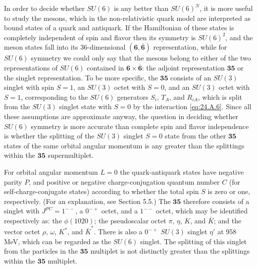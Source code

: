 In order to decide whether $SU(6)$ is any better than $SU(6)^N$, it is more
useful to study the mesons, which in the non-relativistic quark model are
interpreted as bound states of a quark and antiquark. If the Hamiltonian of
these states is completely independent of spin and flavor then its symmetry is
$SU(6)^2$, and the meson states fall into its 36-dimensional
$(\mathbf{6},\overline{\mathbf{6}})$ representation, while for $SU(6)$
symmetry we could only say that the mesons belong to either of the two
representations of $SU(6)$ contained in
$\mathbf{6}\times\overline{\mathbf{6}}$: the adjoint representation
$\mathbf{35}$ or the singlet representation. To be more specific, the
$\mathbf{35}$ consists of an $SU(3)$ singlet with spin $S=1$, an $SU(3)$
octet with $S=0$, and an $SU(3)$ octet with $S=1$, corresponding to the $SU(6)$
generators $S_i$, $T_A$, and $R_{iA}$, which is split from the $SU(3)$ singlet
state with $S=0$ by the interaction \eqref{eq:24.A.6}. Since all these
assumptions are approximate anyway, the question in deciding whether $SU(6)$
symmetry is more accurate than complete spin and flavor independence is
whether the splitting of the $SU(3)$ singlet $S=0$ state from the other
$\mathbf{35}$ states of the same orbital angular momentum is any greater than
the splittings within the $\mathbf{35}$ supermultiplet.

For orbital angular momentum $L=0$ the quark-antiquark states have negative
parity $P$, and positive or negative charge-conjugation quantum number $C$ (for
self-charge-conjugate states) according to whether the total spin $S$ is zero
or one, respectively. (For an explanation, see Section 5.5.) The $\mathbf{35}$
therefore consists of a singlet with $J^{PC}=1^{--}$, a $0^{-+}$ octet, and a
$1^{--}$ octet, which may be identified respectively as: the $\phi(1020)$; the
pseudoscalar octet $\pi$, $\eta$, $K$, and $\bar K$; and the vector octet
$\rho$, $\omega$, $K^*$, and $\bar K^*$. There is also a $0^{-+}$ $SU(3)$
singlet $\eta'$ at 958 MeV, which can be regarded as the $SU(6)$ singlet. The
splitting of this singlet from the particles in the $\mathbf{35}$ multiplet is
not distinctly greater than the splittings within the $\mathbf{35}$ multiplet.

